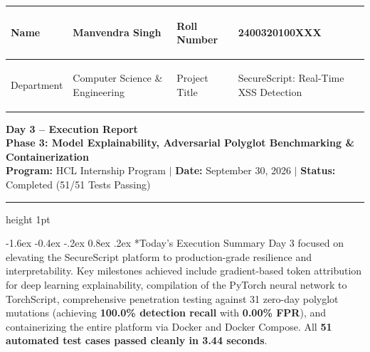 \documentclass[11pt,a4paper]{article}
\makeatletter
\renewcommand{\section}{\@startsection{section}{1}{\z@}%
  {-1.6ex \@plus -0.4ex \@minus -.2ex}%
  {0.8ex \@plus .2ex}%
  {\normalfont\large\bfseries\color{primaryblue}}}
\makeatother
\begin{document}

\noindent
\begin{tabularx}{\textwidth}{|>{\bfseries\raggedright\arraybackslash}p{2.2cm}|>{\raggedright\arraybackslash}X|>{\bfseries\raggedright\arraybackslash}p{2.3cm}|>{\raggedright\arraybackslash}X|}
\hline
\rowcolor{primaryblue!10}
Name & Manvendra Singh & Roll Number & 2400320100XXX \\
\hline
\rowcolor{primaryblue!5}
Department & Computer Science \& Engineering & Project Title & SecureScript: Real-Time XSS Detection \\
\hline
\end{tabularx}

\vspace{0.8em}

\begin{center}
    {\LARGE \textbf{\color{primaryblue} Day 3 -- Execution Report}} \\[0.25em]
    {\large \textbf{Phase 3: Model Explainability, Adversarial Polyglot Benchmarking \& Containerization}} \\[0.2em]
    {\footnotesize \textbf{Program:} HCL Internship Program \quad $\vert$ \quad \textbf{Date:} September 30, 2026 \quad $\vert$ \quad \textbf{Status:} Completed (51/51 Tests Passing)}
\end{center}

\vspace{0.3em}
\hrule height 1pt
\vspace{0.8em}

\section*{Today's Execution Summary}
Day 3 focused on elevating the SecureScript platform to production-grade resilience and interpretability. Key milestones achieved include gradient-based token attribution for deep learning explainability, compilation of the PyTorch neural network to TorchScript, comprehensive penetration testing against 31 zero-day polyglot mutations (achieving \textbf{100.0\% detection recall} with \textbf{0.00\% FPR}), and containerizing the entire platform via Docker and Docker Compose. All \textbf{51 automated test cases passed cleanly in 3.44 seconds}.
\end{document}
